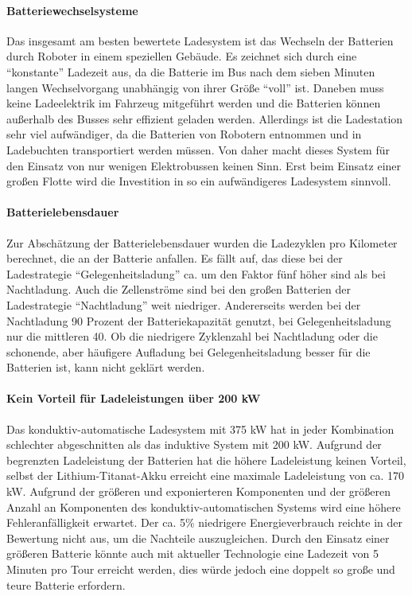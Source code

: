 \paragraph{Batteriewechselsysteme} Das insgesamt am besten bewertete Ladesystem ist das Wechseln der Batterien durch Roboter in einem speziellen Gebäude. Es zeichnet sich durch eine "`konstante"' Ladezeit aus, da die Batterie im Bus nach dem sieben Minuten langen Wechselvorgang unabhängig von ihrer Größe "`voll"' ist. Daneben muss keine Ladeelektrik im Fahrzeug mitgeführt werden und die Batterien können außerhalb des Busses sehr effizient geladen werden. Allerdings ist die Ladestation sehr viel aufwändiger, da die Batterien  von Robotern entnommen und in Ladebuchten transportiert werden müssen. Von daher macht dieses System für den Einsatz von nur wenigen Elektrobussen keinen Sinn. Erst beim Einsatz einer großen Flotte wird die Investition in so ein aufwändigeres Ladesystem sinnvoll.

\paragraph{Batterielebensdauer} Zur Abschätzung der Batterielebensdauer wurden die Ladezyklen pro Kilometer berechnet, die an der Batterie anfallen. Es fällt auf, das diese bei der Ladestrategie "`Gelegenheitsladung"' ca. um den Faktor fünf höher sind als bei Nachtladung. Auch die Zellenströme sind bei den großen Batterien der Ladestrategie "`Nachtladung"' weit niedriger. Andererseits werden bei der Nachtladung 90 Prozent der Batteriekapazität genutzt, bei Gelegenheitsladung nur die mittleren 40. Ob die niedrigere Zyklenzahl bei Nachtladung oder die schonende, aber häufigere Aufladung bei Gelegenheitsladung besser für die Batterien ist, kann nicht geklärt werden.

\paragraph{Kein Vorteil für Ladeleistungen über 200 kW} Das konduktiv-automatische Ladesystem mit 375 kW hat in jeder Kombination schlechter abgeschnitten als das induktive System mit 200 kW. Aufgrund der begrenzten Ladeleistung der Batterien hat die höhere Ladeleistung keinen Vorteil, selbst der Lithium-Titanat-Akku erreicht eine maximale Ladeleistung von ca. 170 kW. Aufgrund der größeren und exponierteren Komponenten und der größeren Anzahl an Komponenten des konduktiv-automatischen Systems wird eine höhere Fehleranfälligkeit erwartet. Der ca. 5\% niedrigere Energieverbrauch reichte in der Bewertung nicht aus, um die Nachteile auszugleichen. Durch den Einsatz einer größeren Batterie könnte auch mit aktueller Technologie eine Ladezeit von 5 Minuten pro Tour erreicht werden, dies würde jedoch eine doppelt so große und teure Batterie erfordern.

